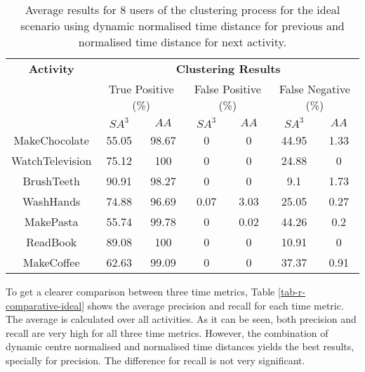 \begin{table}[htbp]\scriptsize
    \begin{center}    
        \begin{tabular}{ccccccc}
            \hline            
            \textbf{Activity} & \multicolumn{6}{c}{\textbf{Clustering Results}} \\
             & \multicolumn{2}{c}{True Positive (\%)} & \multicolumn{2}{c}{False Positive (\%)} & \multicolumn{2}{c}{False Negative (\%)} \\
             & $SA^3$ & $AA$ & $SA^3$ & $AA$ & $SA^3$ & $AA$ \\
            \hline
            MakeChocolate   & 55.05 & 98.67 & 0    & 0    & 44.95 & 1.33 \\
	    WatchTelevision & 75.12 & 100   & 0    & 0    & 24.88 & 0    \\
	    BrushTeeth      & 90.91 & 98.27 & 0    & 0    & 9.1   & 1.73 \\
	    WashHands       & 74.88 & 96.69 & 0.07 & 3.03 & 25.05 & 0.27 \\
	    MakePasta       & 55.74 & 99.78 & 0    & 0.02 & 44.26 & 0.2 \\
	    ReadBook        & 89.08 & 100   & 0    & 0    & 10.91 & 0 \\
	    MakeCoffee      & 62.63 & 99.09 & 0    & 0    & 37.37 & 0.91 \\
            \hline
        \end{tabular}
        \caption{Average results for 8 users of the clustering process for the ideal scenario using dynamic normalised time distance for previous and normalised time distance for next activity.}
        \label{tab-r-ideal-t3}
    \end{center}
\end{table}

To get a clearer comparison between three time metrics, Table \ref{tab-r-comparative-ideal} shows the average precision and recall for each time metric. The average is calculated over all activities. As it can be seen, both precision and recall are very high for all three time metrics. However, the combination of dynamic centre normalised and normalised time distances yields the best results, specially for precision. The difference for recall is not very significant. 

